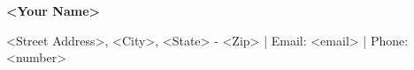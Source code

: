 \documentclass[a4paper,10pt]{article}
\newcommand{\resitem}[1]{\item #1}
\newcommand{\resheading}[1]{\vspace{0.5em} {\small \colorbox{mygrey}{\begin{minipage}{0.975\textwidth}{\textbf{#1}}\end{minipage}}} \vspace{0.5em}}
\begin{document}
\begin{center} \Large{\textbf{<Your Name>}} \end{center}
\vspace{2pt}
\begin{center} <Street Address>, <City>, <State> - <Zip> | Email: <email> | Phone: <number> \end{center}
\end{document}
